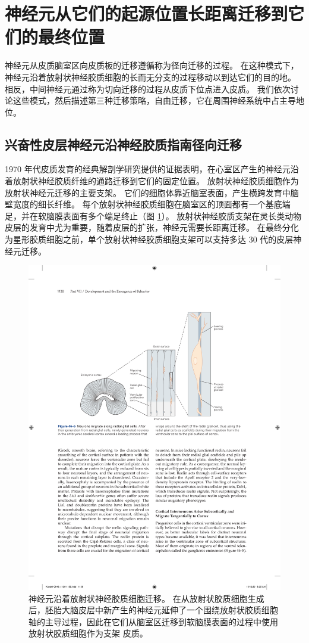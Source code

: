 \section{神经元从它们的起源位置长距离迁移到它们的最终位置}
神经元从皮质脑室区向皮质板的迁移遵循称为径向迁移的过程。 在这种模式下，神经元沿着放射状神经胶质细胞的长而无分支的过程移动以到达它们的目的地。 相反，中间神经元通过称为切向迁移的过程从皮质下位点进入皮质。 我们依次讨论这些模式，然后描述第三种迁移策略，自由迁移，它在周围神经系统中占主导地位。

\subsection{兴奋性皮层神经元沿神经胶质指南径向迁移}
1970 年代皮质发育的经典解剖学研究提供的证据表明，在心室区产生的神经元沿着放射状神经胶质纤维的通路迁移到它们的固定位置。 放射状神经胶质细胞作为放射状神经元迁移的主要支架。 它们的细胞体靠近脑室表面，产生横跨发育中脑壁宽度的细长纤维。 
每个放射状神经胶质细胞在脑室区的顶面都有一个基底端足，并在软脑膜表面有多个端足终止（图 \ref{fig:46_6}）。 
放射状神经胶质支架在灵长类动物皮层的发育中尤为重要，随着皮层的扩张，神经元需要长距离迁移。 在最终分化为星形胶质细胞之前，单个放射状神经胶质细胞支架可以支持多达 30 代的皮层神经元迁移。

\begin{figure}[htbp]
	\centering
	\includegraphics[width=0.6\linewidth]{chap46/fig_46_6}
	\caption{神经元沿着放射状神经胶质细胞迁移。 在从放射状胶质细胞生成后，胚胎大脑皮层中新产生的神经元延伸了一个围绕放射状胶质细胞轴的主导过程，因此在它们从脑室区迁移到软脑膜表面的过程中使用放射状胶质细胞作为支架 皮质。}
	\label{fig:46_6}
\end{figure}

